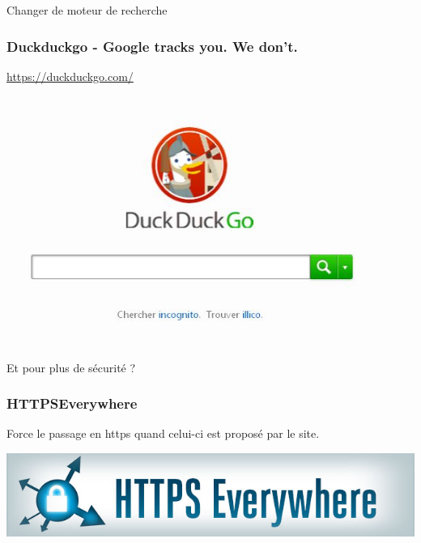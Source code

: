 \documentclass{beamer}
\begin{document}
\begin{frame}
\begin{center}
\Huge{Changer de moteur de recherche}
\end{center}
\end{frame}

\begin{frame}
\begin{center}
\frametitle{Duckduckgo - Google tracks you. We don't.}

\url{https://duckduckgo.com/}
\\
\includegraphics[scale=0.6] {./images/DuckDuckGo.jpg}
\end{center}
\end{frame}

\begin{frame}
\begin{center}
\Huge{Et pour plus de sécurité ?}
\end{center}
\end{frame}

\begin{frame}
\frametitle{HTTPSEverywhere}

Force le passage en https quand celui-ci est proposé par le site.

\begin{center}
\includegraphics[scale=0.4] {./images/https-everywhere.jpg}
\end{center}

\end{frame}
\end{document}
